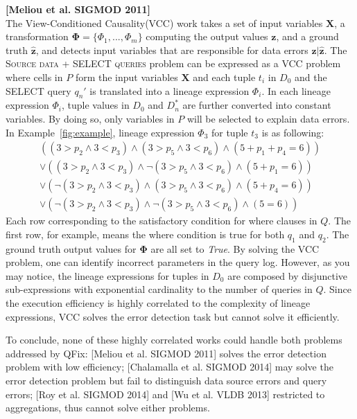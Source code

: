 \documentclass{vldb}
\newcounter{prob}
\newcommand{\sys}{QFix\xspace}
\begin{document}
\noindent \textbf{[Meliou et al. SIGMOD 2011]} \\
The View-Conditioned Causality(VCC) work takes a set of input variables $\mathbf{X}$, a transformation $\mathbf{\Phi} =\{\Phi_1, ... , \Phi_m\}$ computing the
output values $\mathbf{z}$, and a ground truth $\hat{\mathbf{z}}$, and detects input variables that are responsible for data errors $\mathbf{z}|\hat{\mathbf{z}}$. 
The \textsc{Source data + SELECT queries} problem can be expressed as a VCC problem where cells in $P$ form the input variables $\mathbf{X}$ and each tuple $t_i$ in $D_0$ and the SELECT query $q_n'$ is translated into a lineage expression $\Phi_i$. In each lineage expression $\Phi_i$, tuple values in $D_0$ and $D_n^*$ are further converted into constant variables. By doing so, only variables in $P$ will be selected to explain data errors. In Example~\ref{fig:example}, lineage expression $\Phi_3$ for tuple $t_3$ is as following:
{\small
\begin{eqnarray*}
&((3 > p_2 \wedge 3 < p_3) \wedge (3 > p_5 \wedge 3 < p_6) \wedge (5 + p_1+p_4 = 6)) &\\
&\vee ((3 > p_2 \wedge 3 < p_3) \wedge \neg(3 > p_5 \wedge 3 < p_6) \wedge (5 + p_1= 6))& \\
&\vee (\neg(3 > p_2 \wedge 3 < p_3) \wedge (3 > p_5 \wedge 3 < p_6) \wedge (5 + p_4= 6))& \\
&\vee (\neg(3 > p_2 \wedge 3 < p_3) \wedge \neg(3 > p_5 \wedge 3 < p_6) \wedge (5 = 6))&
\end{eqnarray*}
}
Each row corresponding to the satisfactory condition for where clauses in $Q$. The first row, for example, means the where condition is true for both $q_1$ and $q_2$. The ground truth output values for $\mathbf{\Phi}$ are all set to \textit{True}. By solving the VCC problem, one can identify incorrect parameters in the query log. However, as you may notice, the lineage expressions for tuples in $D_0$ are composed by disjunctive sub-expressions with exponential cardinality to the number of queries in $Q$. Since the execution efficiency is highly correlated to the complexity of lineage expressions, VCC solves the error detection task but cannot solve it efficiently. 

To conclude, none of these highly correlated works could handle both problems addressed by \sys: [Meliou et al. SIGMOD 2011] solves the error detection problem with low efficiency; [Chalamalla et al. SIGMOD 2014] may solve the error detection problem but fail to distinguish data source errors and query errors; [Roy et al. SIGMOD 2014] and [Wu et al. VLDB 2013] restricted to aggregations, thus cannot solve either problems.
\end{document}

